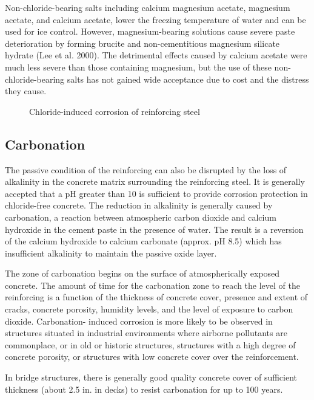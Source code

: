 Non-chloride-bearing salts including calcium magnesium acetate, magnesium acetate, and calcium acetate, lower
the freezing temperature of water and can be used for ice control.
 However, magnesium-bearing solutions cause
severe paste deterioration by forming brucite and non-cementitious magnesium silicate hydrate (Lee et al. 2000).
The detrimental effects caused by calcium acetate were much less severe than those containing magnesium, but the
use of these non-chloride-bearing salts has not gained wide acceptance due to cost and the distress they cause.

\begin{figure}
  \caption{Chloride-induced corrosion of reinforcing steel}
  \label{fig:chloride-induced-corrosion-steelbar}
\end{figure}
\subsection{Carbonation}
The passive condition of the reinforcing can also be disrupted by the loss of alkalinity in the concrete matrix
surrounding the reinforcing steel. It is generally accepted that a pH greater than 10 is sufficient to provide corrosion
protection in chloride-free concrete. The reduction in alkalinity is generally caused by carbonation, a reaction between atmospheric carbon dioxide and calcium hydroxide in the cement paste in the presence of water. The result
is a reversion of the calcium hydroxide to calcium carbonate (approx. pH 8.5) which has insufficient alkalinity to
maintain the passive oxide layer.

The zone of carbonation begins on the surface of atmospherically exposed concrete. The amount of time for the
carbonation zone to reach the level of the reinforcing is a function of the thickness of concrete cover, presence and
extent of cracks, concrete porosity, humidity levels, and the level of exposure to carbon dioxide.
 Carbonation-
induced corrosion is more likely to be observed in structures situated in industrial environments where airborne
pollutants are commonplace, or in old or historic structures, structures with a high degree of concrete porosity, or
structures with low concrete cover over the reinforcement.

In bridge structures, there is generally good quality concrete cover of sufficient thickness (about 2.5 in. in decks)
to resist carbonation for up to 100 years.

